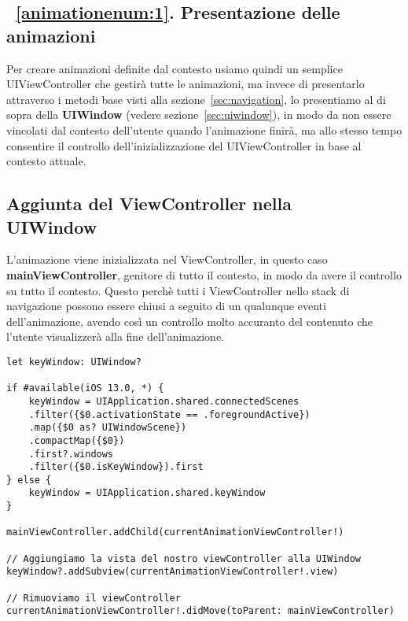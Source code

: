 \subsection{~\ref{animationenum:1}. Presentazione delle animazioni}

Per creare animazioni definite dal contesto usiamo quindi un semplice UIViewController che gestirà tutte le animazioni,
ma invece di presentarlo attraverso i metodi base visti alla sezione~\ref{sec:navigation}, lo presentiamo al di sopra della \textbf{UIWindow} (vedere sezione~\ref{sec:uiwindow}),
in modo da non essere vincolati dal contesto dell'utente quando l'animazione finirà, ma allo stesso tempo
consentire il controllo dell'inizializzazione del UIViewController in base al contesto attuale.

\subsection{Aggiunta del ViewController nella\\UIWindow}

L'animazione viene inizializzata nel ViewController, in questo caso \textbf{mainViewController},
genitore di tutto il contesto, in modo da avere il controllo su tutto 
il contesto. Questo perchè tutti i ViewController nello stack di navigazione possono
essere chiusi a seguito di un qualunque eventi dell'animazione, avendo così un controllo molto accuranto
del contenuto che l'utente visualizzerà alla fine dell'animazione.

\begin{verbatim}
let keyWindow: UIWindow?

if #available(iOS 13.0, *) {
    keyWindow = UIApplication.shared.connectedScenes
    .filter({$0.activationState == .foregroundActive})
    .map({$0 as? UIWindowScene})
    .compactMap({$0})
    .first?.windows
    .filter({$0.isKeyWindow}).first
} else {
    keyWindow = UIApplication.shared.keyWindow
}

mainViewController.addChild(currentAnimationViewController!)

// Aggiungiamo la vista del nostro viewController alla UIWindow
keyWindow?.addSubview(currentAnimationViewController!.view)

// Rimuoviamo il viewController
currentAnimationViewController!.didMove(toParent: mainViewController)
\end{verbatim}

